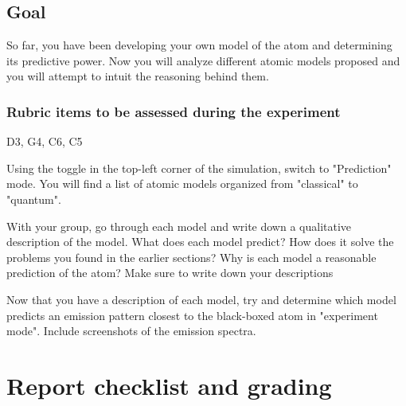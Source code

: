 \subsection{Goal}
So far, you have been developing your own model of the atom and determining its predictive power. Now you will analyze different atomic models proposed and you will attempt to intuit the reasoning behind them. 

\subsubsection{Rubric items to be assessed during the experiment}

D3, G4, C6, C5

\begin{steps}
	\item Using the toggle in the top-left corner of the simulation, switch to "Prediction" mode. You will find a list of atomic models organized from "classical" to "quantum". 
	
	\item With your group, go through each model and write down a qualitative description of the model. What does each model predict? How does it solve the problems you found in the earlier sections? Why is each model a reasonable prediction of the atom? Make sure to write down your descriptions
	
	\item Now that you have a description of each model, try and determine which model predicts an emission pattern closest to the black-boxed atom in "experiment mode". Include screenshots of the emission spectra.
	
\end{steps} 

\section{Report checklist and grading}
